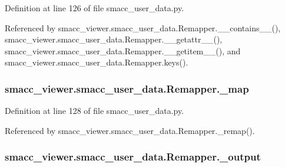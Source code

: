 Definition at line 126 of file smacc\+\_\+user\+\_\+data.\+py.



Referenced by smacc\+\_\+viewer.\+smacc\+\_\+user\+\_\+data.\+Remapper.\+\_\+\+\_\+contains\+\_\+\+\_\+(), smacc\+\_\+viewer.\+smacc\+\_\+user\+\_\+data.\+Remapper.\+\_\+\+\_\+getattr\+\_\+\+\_\+(), smacc\+\_\+viewer.\+smacc\+\_\+user\+\_\+data.\+Remapper.\+\_\+\+\_\+getitem\+\_\+\+\_\+(), and smacc\+\_\+viewer.\+smacc\+\_\+user\+\_\+data.\+Remapper.\+keys().

\subsubsection[{\texorpdfstring{\+\_\+map}{_map}}]{\setlength{\rightskip}{0pt plus 5cm}smacc\+\_\+viewer.\+smacc\+\_\+user\+\_\+data.\+Remapper.\+\_\+map\hspace{0.3cm}{\ttfamily [private]}}\hypertarget{classsmacc__viewer_1_1smacc__user__data_1_1Remapper_a25f3632c15ad2e88ee178cd5e1797cf8}{}\label{classsmacc__viewer_1_1smacc__user__data_1_1Remapper_a25f3632c15ad2e88ee178cd5e1797cf8}


Definition at line 128 of file smacc\+\_\+user\+\_\+data.\+py.



Referenced by smacc\+\_\+viewer.\+smacc\+\_\+user\+\_\+data.\+Remapper.\+\_\+remap().

\subsubsection[{\texorpdfstring{\+\_\+output}{_output}}]{\setlength{\rightskip}{0pt plus 5cm}smacc\+\_\+viewer.\+smacc\+\_\+user\+\_\+data.\+Remapper.\+\_\+output\hspace{0.3cm}{\ttfamily [private]}}\hypertarget{classsmacc__viewer_1_1smacc__user__data_1_1Remapper_aafa61285cd9e59e1a326c346aea0a81f}{}\label{classsmacc__viewer_1_1smacc__user__data_1_1Remapper_aafa61285cd9e59e1a326c346aea0a81f}


